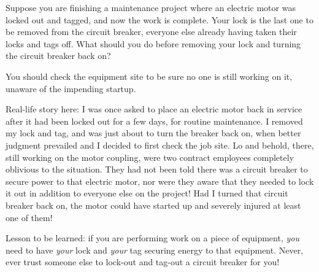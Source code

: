 

Suppose you are finishing a maintenance project where an electric motor was locked out and tagged, and now the work is complete.  Your lock is the last one to be removed from the circuit breaker, everyone else already having taken their locks and tags off.  What should you do before removing your lock and turning the circuit breaker back on?







You should check the equipment site to be sure no one is still working on it, unaware of the impending startup.







Real-life story here: I was once asked to place an electric motor back in service after it had been locked out for a few days, for routine maintenance.  I removed my lock and tag, and was just about to turn the breaker back on, when better judgment prevailed and I decided to first check the job site.  Lo and behold, there, still working on the motor coupling, were two contract employees completely oblivious to the situation.  They had not been told there was a circuit breaker to secure power to that electric motor, nor were they aware that they needed to lock it out in addition to everyone else on the project!  Had I turned that circuit breaker back on, the motor could have started up and severely injured at least one of them!

Lesson to be learned: if you are performing work on a piece of equipment, {\it you} need to have {\it your} lock and {\it your} tag securing energy to that equipment.  Never, ever trust someone else to lock-out and tag-out a circuit breaker for you!




